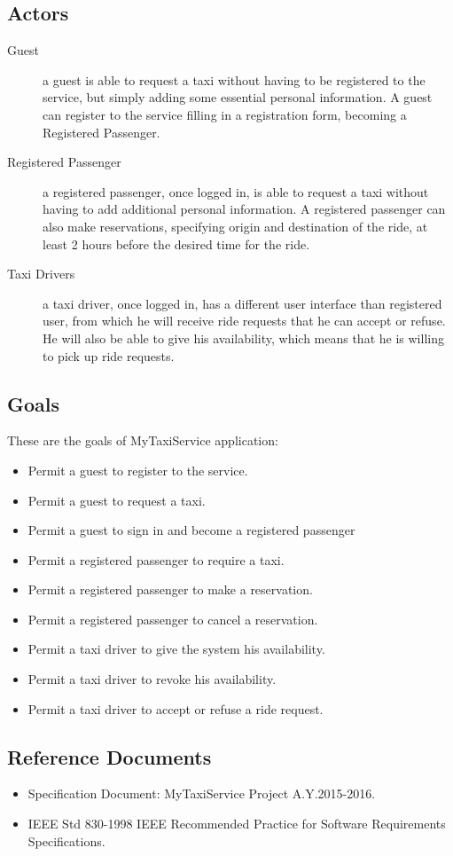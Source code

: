 \subsection{Actors}
\begin{description}
	\item[Guest] a guest is able to request a taxi without having to be registered to the service, but simply adding some essential personal information. A guest can register to the service filling in a registration form, becoming a Registered Passenger.
	\item[Registered Passenger] a registered passenger, once logged in, is able to request a taxi without having to add additional personal information. A registered passenger can also make reservations, specifying origin and destination of the ride, at least 2 hours before the desired time for the ride.
	\item[Taxi Drivers] a taxi driver, once logged in, has a different user interface than registered user, from which he will receive ride requests that he can accept or refuse. He will also be able to give his availability, which means that he is willing to pick up ride requests.
\end{description}
\subsection{Goals}
These are the goals of MyTaxiService application:
\begin{itemize}
	\item Permit a guest to register to the service.
	\item Permit a guest to request a taxi.
	\item Permit a guest to sign in and become a registered passenger
	\item Permit a registered passenger to require a taxi.
	\item Permit a registered passenger to make a reservation.
	\item Permit a registered passenger to cancel a reservation.
	\item Permit a taxi driver to give the system his availability.
	\item Permit a taxi driver to revoke his availability.
	\item Permit a taxi driver to accept or refuse a ride request.
\end{itemize}
\subsection{Reference Documents}
\begin{itemize}
	\item Specification Document: MyTaxiService Project A.Y.2015-2016.
	\item IEEE Std 830-1998 IEEE Recommended Practice for Software Requirements Specifications.
\end{itemize}

